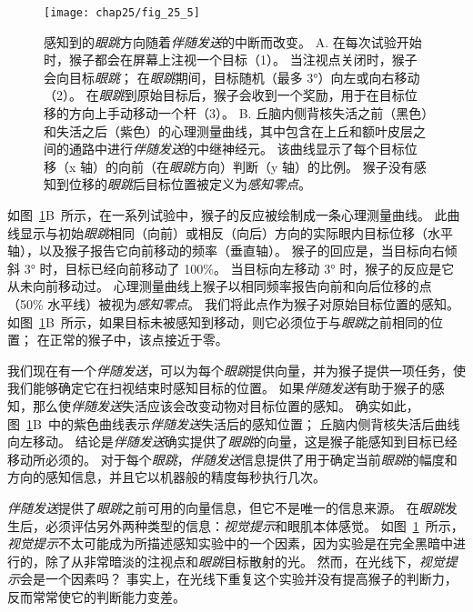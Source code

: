 \begin{figure}[htbp]
	\centering
	\texttt{[image: chap25/fig\_25\_5]}
	\caption{感知到的\textit{眼跳}方向随着\textit{伴随发送}的中断而改变。
		A. 在每次试验开始时，猴子都会在屏幕上注视一个目标（1）。
		当注视点关闭时，猴子会向目标\textit{眼跳}；
		在\textit{眼跳}期间，目标随机（最多 3°）向左或向右移动（2）。
		在\textit{眼跳}到原始目标后，猴子会收到一个奖励，用于在目标位移的方向上手动移动一个杆（3）。
		B. 丘脑内侧背核失活之前（黑色）和失活之后（紫色）的心理测量曲线，其中包含在上丘和额叶皮层之间的通路中进行\textit{伴随发送}的中继神经元。
		该曲线显示了每个目标位移（x 轴）的向前（在\textit{眼跳}方向）判断（y 轴）的比例。
		猴子没有感知到位移的\textit{眼跳}后目标位置被定义为\textit{感知零点}\cite{cavanaugh2016saccadic}。}
	\label{fig:25_5}
\end{figure}


如图~\ref{fig:25_5}B~所示，在一系列试验中，猴子的反应被绘制成一条心理测量曲线。
此曲线显示与初始\textit{眼跳}相同（向前）或相反（向后）方向的实际眼内目标位移（水平轴），以及猴子报告它向前移动的频率（垂直轴）。
猴子的回应是，当目标向右倾斜 3° 时，目标已经向前移动了 100\%。
当目标向左移动 3° 时，猴子的反应是它从未向前移动过。
心理测量曲线上猴子以相同频率报告向前和向后位移的点（50\% 水平线）被视为\textit{感知零点}。
我们将此点作为猴子对原始目标位置的感知。
如图~\ref{fig:25_5}B~所示，如果目标未被感知到移动，则它必须位于与\textit{眼跳}之前相同的位置；
在正常的猴子中，该点接近于零。


我们现在有一个\textit{伴随发送}，可以为每个\textit{眼跳}提供向量，并为猴子提供一项任务，使我们能够确定它在扫视结束时感知目标的位置。
如果\textit{伴随发送}有助于猴子的感知，那么使\textit{伴随发送}失活应该会改变动物对目标位置的感知。
确实如此，图~\ref{fig:25_5}B~中的紫色曲线表示\textit{伴随发送}失活后的感知位置；
丘脑内侧背核失活后曲线向左移动。
结论是\textit{伴随发送}确实提供了\textit{眼跳}的向量，这是猴子能感知到目标已经移动所必须的。
对于每个\textit{眼跳}，\textit{伴随发送}信息提供了用于确定当前\textit{眼跳}的幅度和方向的感知信息，并且它以机器般的精度每秒执行几次。


\textit{伴随发送}提供了\textit{眼跳}之前可用的向量信息，但它不是唯一的信息来源。
在\textit{眼跳}发生后，必须评估另外两种类型的信息：\textit{视觉提示}和眼肌本体感觉。
如图~\ref{fig:25_5}~所示，\textit{视觉提示}不太可能成为所描述感知实验中的一个因素，因为实验是在完全黑暗中进行的，除了从非常暗淡的注视点和\textit{眼跳}目标散射的光。
然而，在光线下，\textit{视觉提示}会是一个因素吗？
事实上，在光线下重复这个实验并没有提高猴子的判断力，反而常常使它的判断能力变差。


